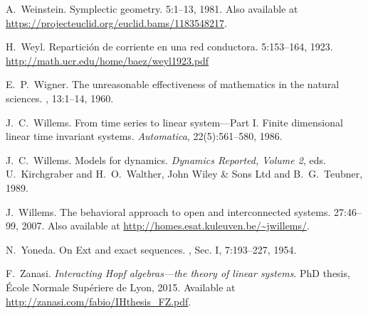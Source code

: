 \begin{thebibliography}{RSW00}


    A.\ Weinstein.
    \newblock Symplectic geometry.
     { 5}:1--13, 1981.
    \newblock Also available at 	
    \href{https://projecteuclid.org/euclid.bams/1183548217}
    {https://projecteuclid.org/euclid.bams/1183548217}.

    H.\ Weyl.
    \newblock Repartici\'on de corriente en una red conductora.
     { 5}:153--164, 1923.
    \newblock \href{http://math.ucr.edu/home/baez/weyl1923.pdf}{http://math.ucr.edu/home/baez/weyl1923.pdf}


    E.\ P.\ Wigner.
    \newblock The unreasonable effectiveness of mathematics in the natural
    sciences.
    , 13:1--14,
    1960.

    J.\ C.\ Willems.
    \newblock From time series to linear system---Part I.
    Finite dimensional linear time invariant systems.
    \newblock \emph{Automatica}, 22(5):561--580, 1986. 

    J.\ C.\ Willems.
    \newblock Models for dynamics.
    \newblock \emph{Dynamics Reported,
    Volume 2}, eds. U.\ Kirchgraber and H.\ O.\ Walther, John Wiley \& Sons
    Ltd and B.\ G.\ Teubner, 1989.

    J.\ Willems.
    \newblock The behavioral approach to open and interconnected
    systems.
     { 27}:46--99, 2007.
    \newblock Also available at
    \href{http://homes.esat.kuleuven.be/~jwillems/}  
    {http://homes.esat.kuleuven.be/\~{}jwillems/}.


    N.\ Yoneda. 
    \newblock On Ext and exact sequences.
    , Sec. I, 7:193--227, 1954.

     F.\ Zanasi. 
    \newblock \emph{Interacting Hopf algebras---the theory of linear
    systems}. 
    \newblock PhD thesis, \'Ecole Normale Sup\'eriere de Lyon, 2015. 
    \newblock Available
    at \href{http://zanasi.com/fabio/IHthesis_FZ.pdf}
    {http://zanasi.com/fabio/IHthesis\_FZ.pdf}.

\end{thebibliography}


